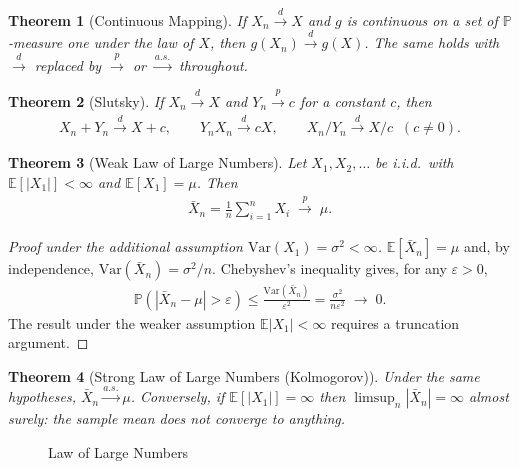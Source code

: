 \documentclass[11pt]{article}
\theoremstyle{definition}
\theoremstyle{plain}
\newtheorem{theorem}{Theorem}[section]
\theoremstyle{remark}
\begin{document}
\begin{theorem}[Continuous Mapping]
    If $X_n \xrightarrow{d} X$ and $g$ is continuous on a set of $\mathbb{P}$-measure one under the law of $X$, then $g(X_n) \xrightarrow{d} g(X)$. The same holds with $\xrightarrow{d}$ replaced by $\xrightarrow{p}$ or $\xrightarrow{a.s.}$ throughout.
\end{theorem}

\begin{theorem}[Slutsky]
    If $X_n \xrightarrow{d} X$ and $Y_n \xrightarrow{p} c$ for a constant $c$, then
    \begin{align}
        X_n + Y_n \xrightarrow{d} X + c, \qquad Y_n X_n \xrightarrow{d} cX, \qquad X_n / Y_n \xrightarrow{d} X/c \;\;(c \neq 0).
    \end{align}
\end{theorem}

\begin{theorem}[Weak Law of Large Numbers]
    Let $X_1, X_2, \dots$ be i.i.d.\ with $\mathbb{E}[|X_1|] < \infty$ and $\mathbb{E}[X_1] = \mu$. Then
    \begin{align}
        \bar{X}_n = \frac{1}{n}\sum_{i=1}^n X_i \;\xrightarrow{p}\; \mu .
    \end{align}
\end{theorem}
\begin{proof}[Proof under the additional assumption $\mathrm{Var}(X_1) = \sigma^2 < \infty$]
    $\mathbb{E}[\bar{X}_n] = \mu$ and, by independence, $\mathrm{Var}(\bar{X}_n) = \sigma^2/n$. Chebyshev's inequality gives, for any $\varepsilon > 0$,
    \begin{align}
        \mathbb{P}\!\left(|\bar{X}_n - \mu| > \varepsilon\right) \leq \frac{\mathrm{Var}(\bar{X}_n)}{\varepsilon^2} = \frac{\sigma^2}{n\varepsilon^2} \;\longrightarrow\; 0.
    \end{align}
    The result under the weaker assumption $\mathbb{E}|X_1| < \infty$ requires a truncation argument.
\end{proof}

\begin{theorem}[Strong Law of Large Numbers (Kolmogorov)]
    Under the same hypotheses, $\bar{X}_n \xrightarrow{a.s.} \mu$. Conversely, if $\mathbb{E}[|X_1|] = \infty$ then $\limsup_n |\bar{X}_n| = \infty$ almost surely: the sample mean does not converge to anything.
\end{theorem}

\begin{figure}[h]
    \centering
    
    \caption{Law of Large Numbers}
    \label{fig:placeholder}
\end{figure}
\end{document}
